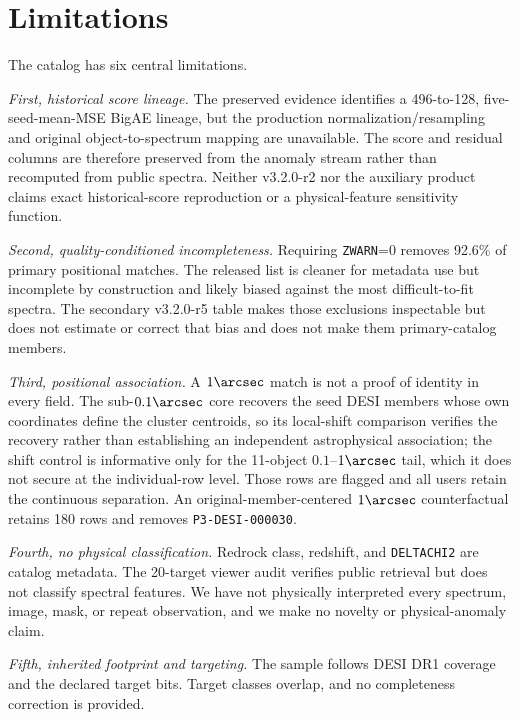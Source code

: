 \documentclass[twocolumn,linenumbers]{aastex702}
\newcommand{\releaseVersion}{v3.2.0-r2}
\newcommand{\warnedAuxVersion}{v3.2.0-r5}
\begin{document}
\section{Limitations}\label{sec:limitations}

The catalog has six central limitations.

\textit{First, historical score lineage.}  The preserved evidence identifies a 496-to-128,
five-seed-mean-MSE BigAE lineage, but the production normalization/resampling and original
object-to-spectrum mapping are unavailable.  The score and residual columns are therefore
preserved from the anomaly stream rather than recomputed from public spectra.  Neither
\releaseVersion{} nor the auxiliary product claims exact historical-score reproduction or a
physical-feature sensitivity function.

\textit{Second, quality-conditioned incompleteness.}  Requiring \texttt{ZWARN}=0 removes 92.6\%
of primary positional matches.  The released list is cleaner for metadata use but incomplete by
construction and likely biased against the most difficult-to-fit spectra.  The secondary
\warnedAuxVersion{} table makes those exclusions inspectable but does not estimate or correct that
bias and does not make them primary-catalog members.

\textit{Third, positional association.}  A $1\arcsec$ match is not a proof of identity in every
field.  The sub-$0.1\arcsec$ core recovers the seed DESI members whose own coordinates define the
cluster centroids, so its local-shift comparison verifies the recovery rather than establishing an
independent astrophysical association; the shift control is informative only for the 11-object
$0.1$--$1\arcsec$ tail, which it does not secure at the individual-row level.  Those rows are
flagged and all users retain the continuous separation.  An original-member-centered $1\arcsec$
counterfactual retains 180 rows and removes \texttt{P3-DESI-000030}.

\textit{Fourth, no physical classification.}  Redrock class, redshift, and \texttt{DELTACHI2} are
catalog metadata.  The 20-target viewer audit verifies public retrieval but does not classify
spectral features.  We have not physically interpreted every spectrum, image, mask, or repeat
observation, and we make no novelty or physical-anomaly claim.

\textit{Fifth, inherited footprint and targeting.}  The sample follows DESI DR1 coverage and the
declared target bits.  Target classes overlap, and no completeness correction is provided.
\end{document}

